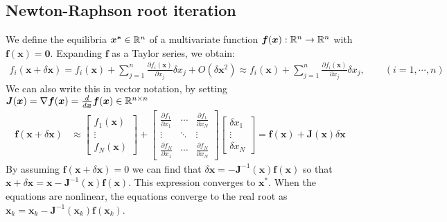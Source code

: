 \subsection{Newton-Raphson root iteration} \label{app:NewtonRaphson}
We define the equilibria $\boldsymbol{x^\ast} \in {\mathbb{R}}^n$ of a multivariate function $\boldsymbol{f}(\boldsymbol{x}) : {\mathbb{R}}^n \rightarrow {\mathbb{R}}^n$ with $\boldsymbol{f}(\boldsymbol{x}) = \boldsymbol{0}$. Expanding $\boldsymbol{f}$ as a Taylor series, we obtain:
\begin{align*}
f_i(\boldsymbol{x} + \delta \boldsymbol{x}) =f_{i}(\boldsymbol{x}) + \sum_{j=1}^{n} \frac{\partial f_{i}(\boldsymbol{x})}{\partial x_{j}} \delta x_{j}+O\left(\delta \boldsymbol{x}^{2}\right) \approx f_{i}(\boldsymbol{x})+\sum_{j=1}^{n} \frac{\partial f_{i}(\boldsymbol{x})}{\partial x_{j}} \delta x_{j}, \qquad (i=1, \cdots, n)
\end{align*}
We can also write this in vector notation, by setting $\boldsymbol{J}(\boldsymbol{x}) = \nabla \boldsymbol{f}(\boldsymbol{x}) = \frac{d}{d\boldsymbol{x}} \boldsymbol{f}(\boldsymbol{x}) \in {\mathbb{R}}^{n \times n}$ 
\begin{align*}
\boldsymbol{f}(\boldsymbol{x}+\delta \boldsymbol{x}) &\approx\left[\begin{array}{c}f_{1}(\boldsymbol{x}) \\ \vdots \\ f_{N}(\boldsymbol{x})\end{array}\right] 
+ \left[\begin{array}{ccc}\frac{\partial f_{1}}{\partial x_{1}} & \cdots & \frac{\partial f_{1}}{\partial x_{N}} \\ \vdots & \ddots & \vdots \\ \frac{\partial f_{N}}{\partial x_{1}} & \cdots & \frac{\partial f_{N}}{\partial x_{N}}\end{array}\right]
\left[\begin{array}{c}\delta x_{1} \\ \vdots \\ \delta x_{N}\end{array}\right] 
=\boldsymbol{f}(\boldsymbol{x})+\boldsymbol{J}(\boldsymbol{x}) \delta \boldsymbol{x} 
\end{align*}
By assuming $\boldsymbol{f}(\boldsymbol{x}+\delta \boldsymbol{x}) = 0$ we can find that $\delta \boldsymbol{x} = -\boldsymbol{J}^{-1}( \boldsymbol{x}) \boldsymbol{f}(\boldsymbol{x})$ so that $\boldsymbol{x} + \delta \boldsymbol{x} =  \boldsymbol{x} - \boldsymbol{J}^{-1} (\boldsymbol{x}) \boldsymbol{f}(\boldsymbol{x})$. This expression converges to $\boldsymbol{x^\ast}$. When the equations are nonlinear, the equations converge to the real root as $\boldsymbol{x}_k =  \boldsymbol{x}_k - \boldsymbol{J}^{-1} ( \boldsymbol{x}_k)\boldsymbol{f}(\boldsymbol{x}_k)$.


